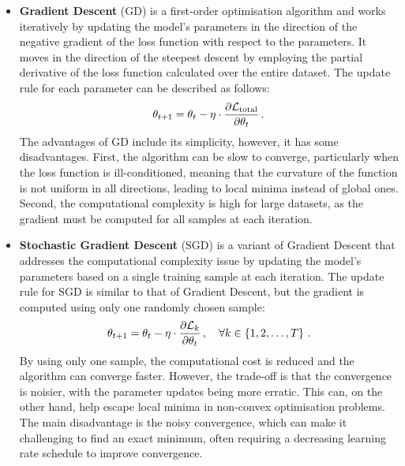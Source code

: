 \begin{itemize}[leftmargin=1.5em]
    \setlength\itemsep{0.2cm}

    \item\textbf{Gradient Descent} (GD) is a first-order optimisation algorithm and works iteratively by updating the model's parameters in the direction of the negative gradient of the loss function with respect to the parameters. It moves in the direction of the steepest descent by employing the partial derivative of the loss function calculated over the entire dataset. The update rule for each parameter can be described as follows:
    \begin{equation}
        \theta_{t+1} = \theta_{t} - \eta\cdot \dfrac{\partial \mathcal{L}_\text{total}}{\partial \theta_{t}}\,.
    \end{equation}
    The advantages of GD include its simplicity, however, it has some disadvantages. First, the algorithm can be slow to converge, particularly when the loss function is ill-conditioned, meaning that the curvature of the function is not uniform in all directions, leading to local minima instead of global ones. Second, the computational complexity is high for large datasets, as the gradient must be computed for all samples at each iteration.

    \item\textbf{Stochastic Gradient Descent} (SGD) is a variant of Gradient Descent that addresses the computational complexity issue by updating the model's parameters based on a single training sample at each iteration. The update rule for SGD is similar to that of Gradient Descent, but the gradient is computed using only one randomly chosen sample:
    \begin{equation}
        \theta_{t+1} = \theta_{t} - \eta\cdot \dfrac{\partial \mathcal{L}_k}{\partial \theta_{t}}\,,\quad \forall k \in \left\{ 1, 2, \ldots, T \right\}\,.
    \end{equation}
    By using only one sample, the computational cost is reduced and the algorithm can converge faster. However, the trade-off is that the convergence is noisier, with the parameter updates being more erratic. This can, on the other hand, help escape local minima in non-convex optimisation problems. The main disadvantage is the noisy convergence, which can make it challenging to find an exact minimum, often requiring a decreasing learning rate schedule to improve convergence.


\end{itemize}
